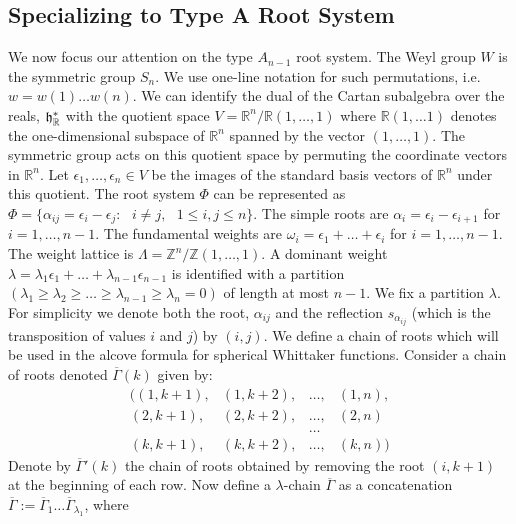 \documentclass[11pt]{amsart}
\begin{document}
{\subsection{Specializing to Type A Root System} We now focus our attention on the type $A_{n-1}$ root system. The Weyl group $W$ is the symmetric group $S_{n}$. We use one-line notation for such permutations, i.e. $w=w(1)\ldots w(n)$. We can identify the dual of the Cartan subalgebra over the reals, $\frak{h}^{*}_{\mathbb{R}}$ with the quotient space $V=\mathbb{R}^{n}/\mathbb{R}(1,\ldots ,1)$ where $\mathbb{R}(1,\ldots1)$ denotes the one-dimensional subspace of $\mathbb{R}^{n}$ spanned by the vector $(1,\ldots ,1)$. The symmetric group acts on this quotient space by permuting the coordinate vectors in $\mathbb{R}^{n}$. Let $\epsilon_{1},\ldots , \epsilon_{n}\in V$ be the images of the standard basis vectors of $\mathbb{R}^{n}$ under this quotient. The root system $\Phi$ can be represented as $\Phi=\{\alpha_{ij}=\epsilon_{i}-\epsilon_{j}:\text{ }i\neq j, \text{ } 1\leq i,j \leq n\}$. The simple roots are $\alpha_{i}=\epsilon_{i}-\epsilon_{i+1}$ for $i=1, \ldots , n-1$. The fundamental weights are $\omega_{i}=\epsilon_{1}+\ldots+\epsilon_{i}$ for $i=1,\ldots , n-1$. The weight lattice is $\Lambda=\mathbb{Z}^{n}/\mathbb{Z}(1,\ldots , 1)$. A dominant weight $\lambda=\lambda_{1}\epsilon_{1}+\ldots+\lambda_{n-1}\epsilon_{n-1}$ is identified with a partition $(\lambda_{1}\geq \lambda_{2} \geq \ldots \geq\lambda_{n-1}\geq \lambda_{n}=0)$ of length at most $n-1$. We fix a partition $\lambda$. For simplicity we denote both the root, $\alpha_{ij}$ and the reflection $s_{\alpha_{ij}}$ (which is the transposition of values $i$ and $j$) by $(i,j)$.
\newline\indent
We define a chain of roots which will be used in the alcove formula for spherical Whittaker functions. Consider a chain of roots denoted $\overline{\Gamma}(k)$ given by: 
\[
\begin{matrix} 
((1,k+1), & (1,k+2), & \ldots, & (1,n),\\
			(2,k+1),& (2,k+2), & \ldots, & (2,n)\\
			& &\ldots &\\
			(k,k+1),& (k,k+2), & \ldots, & (k,n))
\end{matrix}
\]
Denote by $\overline{\Gamma}'(k)$ the chain of roots obtained by removing the root $(i,k+1)$ at the beginning of each row. Now define a $\lambda$-chain $\overline{\Gamma}$ as a concatenation $\overline{\Gamma}:=\overline{\Gamma}_{1}\ldots \overline{\Gamma}_{\lambda_{1}}$, where 
}
\end{document}

